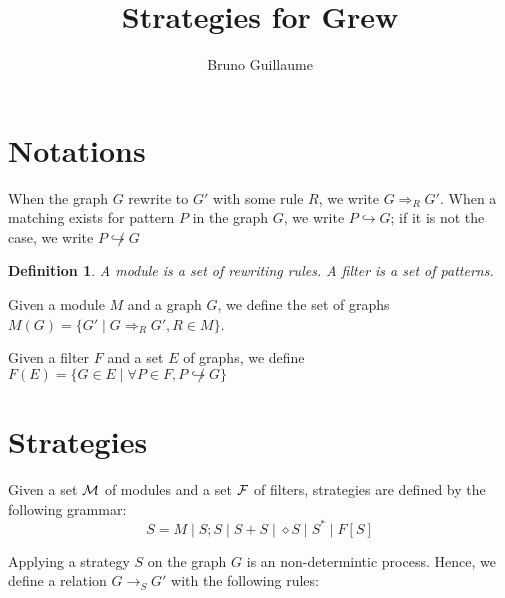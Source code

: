 \documentclass[a4paper]{article}
\title{Strategies for Grew}
\author{Bruno Guillaume}
\newtheorem{definition}{Definition}
\begin{document}
\maketitle

\section{Notations} %
\label{sec:not}

When the graph $G$ rewrite to $G'$ with some rule $R$, we write $G \Longrightarrow_R G'$.
When a matching exists for pattern $P$ in the graph $G$, we write $P \hookrightarrow G$; if it is not the case, we write $P \not\hookrightarrow G$

\begin{definition}
A {\em module} is a set of rewriting rules.
A {\em filter} is a set of patterns.
\end{definition}

Given a module $M$ and a graph $G$, we define the set of graphs $M(G) = \{ G' \mid G \Longrightarrow_R G', R \in M\}$.

Given a filter $F$ and a set $E$ of graphs, we define $F(E) = \{ G \in E \mid \forall P \in F, P \not\hookrightarrow G \}$

\section{Strategies} %
\label{sec:strat}

Given a set $\cal{M}$ of modules and a set $\cal{F}$ of filters, strategies are defined by the following grammar:
\[
	S = M \mid S;S \mid S+S \mid \diamond S \mid S^* \mid F[S]
\]

Applying a strategy $S$ on the graph $G$ is an non-determintic process.
Hence, we define a relation $G \longrightarrow_S G'$ with the following rules:
\end{document}
